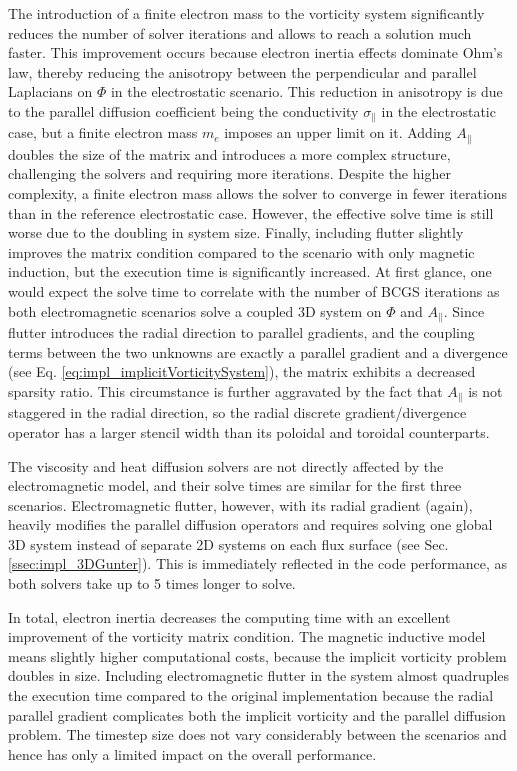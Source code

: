 The introduction of a finite electron mass to the vorticity system significantly reduces the number of solver iterations and allows to reach a solution much faster. This improvement occurs because electron inertia effects dominate Ohm's law, thereby reducing the anisotropy between the perpendicular and parallel Laplacians on $\Phi$ in the electrostatic scenario. This reduction in anisotropy is due to the parallel diffusion coefficient being the conductivity $\sigma_\parallel$ in the electrostatic case, but a finite electron mass $m_e$ imposes an upper limit on it. Adding $A_\parallel$ doubles the size of the matrix and introduces a more complex structure, challenging the solvers and requiring more iterations. Despite the higher complexity, a finite electron mass allows the solver to converge in fewer iterations than in the reference electrostatic case. However, the effective solve time is still worse due to the doubling in system size. Finally, including flutter slightly improves the matrix condition compared to the scenario with only magnetic induction, but the execution time is significantly increased. At first glance, one would expect the solve time to correlate with the number of BCGS iterations as both electromagnetic scenarios solve a coupled 3D system on $\Phi$ and $A_\parallel$. Since flutter introduces the radial direction to parallel gradients, and the coupling terms between the two unknowns are exactly a parallel gradient and a divergence (see Eq. \ref{eq:impl_implicitVorticitySystem}), the matrix exhibits a decreased sparsity ratio. This circumstance is further aggravated by the fact that $A_\parallel$ is not staggered in the radial direction, so the radial discrete gradient/divergence operator has a larger stencil width than its poloidal and toroidal counterparts. \newline

The viscosity and heat diffusion solvers are not directly affected by the electromagnetic model, and their solve times are similar for the first three scenarios. Electromagnetic flutter, however, with its radial gradient (again), heavily modifies the parallel diffusion operators and requires solving one global 3D system instead of separate 2D systems on each flux surface (see Sec. \ref{ssec:impl_3DGunter}). This is immediately reflected in the code performance, as both solvers take up to 5 times longer to solve. \newline

In total, electron inertia decreases the computing time with an excellent improvement of the vorticity matrix condition. The magnetic inductive model means slightly higher computational costs, because the implicit vorticity problem doubles in size. Including electromagnetic flutter in the system almost quadruples the execution time compared to the original implementation because the radial parallel gradient complicates both the implicit vorticity and the parallel diffusion problem. The timestep size does not vary considerably between the scenarios and hence has only a limited impact on the overall performance.



